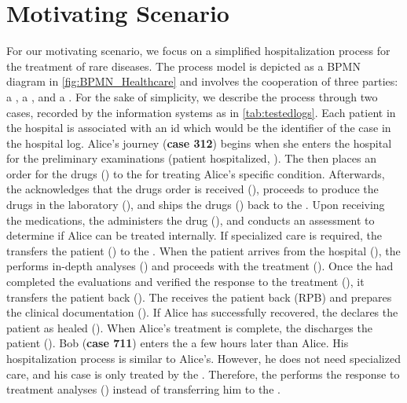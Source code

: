 \section{Motivating Scenario}\label{sec:motivating}
For our motivating scenario, we focus on a simplified hospitalization process for the treatment of rare diseases.
The process model is depicted as a BPMN diagram in \cref{fig:BPMN_Healthcare} and involves the cooperation of three parties: a , a , and a .
For the sake of simplicity, we describe the process through two cases, recorded by the information systems as in \cref{tab:testedlogs}. 
Each patient in the hospital is associated with an id which would be the identifier of the case in the hospital log.
Alice's journey (\textbf{case 312}) begins when she enters the hospital for the preliminary examinations (patient hospitalized, ). The  then places an order for the drugs () to the  for  treating Alice's specific condition. Afterwards, the  acknowledges that the drugs order is received (), proceeds to produce the drugs in the laboratory (), and ships the drugs () back to the . Upon receiving the medications, the  administers the drug (), and conducts an assessment to determine if Alice can be treated internally. If specialized care is required, the  transfers the patient () to the . When the patient arrives from the hospital (), the  performs in-depth analyses () and proceeds with the treatment (). Once the  had completed the evaluations and verified the response to the treatment (), it transfers the patient back (). The  receives the patient back \Activ(RPB) and prepares the clinical documentation (). If Alice has successfully recovered, the  declares the patient as healed (). When Alice's treatment is complete, the  discharges the patient (). 
%
Bob (\textbf{case 711}) enters the  a few hours later than Alice. His hospitalization process is similar to Alice's. However, he does not need specialized care, and his case is only treated by the . Therefore, the  performs the response to treatment analyses () instead of transferring him to the . 

